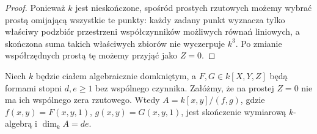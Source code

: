 \begin{proof}
Ponieważ $k$ jest nieskończone, spośród prostych rzutowych
możemy wybrać prostą omijającą wszystkie te punkty:
każdy zadany punkt wyznacza tylko właściwy podzbiór
przestrzeni współczynników możliwych równań liniowych,
a skończona suma takich właściwych zbiorów nie wyczerpuje
$k^3$. Po zmianie współrzędnych prostą tę możemy przyjąć
jako $Z=0$.
\end{proof}

\begin{lemat}
\label{lem:bezout-rank}
Niech $k$ będzie ciałem algebraicznie domkniętym,
a $F,G\in k[X,Y,Z]$ będą formami stopni $d,e\ge1$
bez wspólnego czynnika. Załóżmy, że na prostej $Z=0$
nie ma ich wspólnego zera rzutowego.
Wtedy $A=k[x,y]/(f,g)$, gdzie
$f(x,y)=F(x,y,1)$, $g(x,y)=G(x,y,1)$,
jest skończenie wymiarową $k$-algebrą i
$\dim_kA=de$.
\end{lemat}
